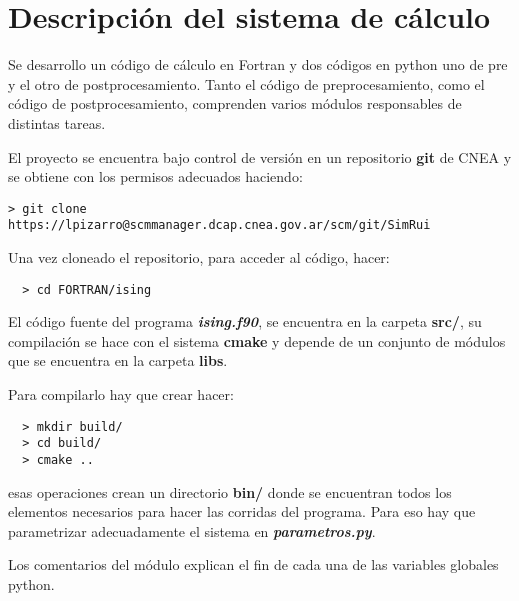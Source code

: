 

\section{Descripci\'on del sistema de c\'alculo}


Se desarrollo un c\'odigo de c\'alculo en Fortran y dos c\'odigos
en python uno  de pre y el otro de postprocesamiento. Tanto el código de 
preprocesamiento, 
como el código de postprocesamiento, comprenden varios módulos responsables de distintas
tareas.

El proyecto se encuentra bajo control de versión en un repositorio \textbf{git} de CNEA
y se obtiene con los permisos adecuados haciendo:

\begin{verbatim}
> git clone https://lpizarro@scmmanager.dcap.cnea.gov.ar/scm/git/SimRui
\end{verbatim}


Una vez cloneado el repositorio, para acceder al código, hacer:

\begin{verbatim}
  > cd FORTRAN/ising
\end{verbatim}



El c\'odigo fuente del programa \textbf{\textit{ising.f90}}, se encuentra en la carpeta
\textbf{src/}, su compilación se hace con el sistema \textbf{cmake} y depende
de un conjunto de módulos que se encuentra en la carpeta \textbf{libs}.

Para compilarlo hay que crear hacer:

\begin{verbatim}
  > mkdir build/
  > cd build/
  > cmake ..
\end{verbatim}

esas operaciones crean un directorio \textbf{bin/} donde se encuentran todos
los elementos necesarios para hacer las corridas del programa.
Para eso hay que parametrizar adecuadamente el sistema en \textbf{\textit{parametros.py}}.

Los comentarios del módulo explican el fin de cada una de las variables globales python.

